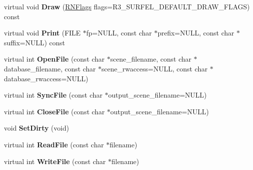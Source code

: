 \begin{DoxyCompactItemize}
\item 
virtual void {\bfseries Draw} (\hyperlink{class_r_n_flags}{R\+N\+Flags} flags=R3\+\_\+\+S\+U\+R\+F\+E\+L\+\_\+\+D\+E\+F\+A\+U\+L\+T\+\_\+\+D\+R\+A\+W\+\_\+\+F\+L\+A\+GS) const \hypertarget{class_r3_surfel_scene_a39a2895331a757858c28331533706f17}{}\label{class_r3_surfel_scene_a39a2895331a757858c28331533706f17}

\item 
virtual void {\bfseries Print} (F\+I\+LE $\ast$fp=N\+U\+LL, const char $\ast$prefix=N\+U\+LL, const char $\ast$suffix=N\+U\+LL) const \hypertarget{class_r3_surfel_scene_a0e6e2dc2ecb2811478aba53316564461}{}\label{class_r3_surfel_scene_a0e6e2dc2ecb2811478aba53316564461}

\item 
virtual int {\bfseries Open\+File} (const char $\ast$scene\+\_\+filename, const char $\ast$database\+\_\+filename, const char $\ast$scene\+\_\+rwaccess=N\+U\+LL, const char $\ast$database\+\_\+rwaccess=N\+U\+LL)\hypertarget{class_r3_surfel_scene_a1f4c23c978414e90f8ebbe42e09f4b4b}{}\label{class_r3_surfel_scene_a1f4c23c978414e90f8ebbe42e09f4b4b}

\item 
virtual int {\bfseries Sync\+File} (const char $\ast$output\+\_\+scene\+\_\+filename=N\+U\+LL)\hypertarget{class_r3_surfel_scene_a83d49ef4d3d30010d5cc88592cbb0dfc}{}\label{class_r3_surfel_scene_a83d49ef4d3d30010d5cc88592cbb0dfc}

\item 
virtual int {\bfseries Close\+File} (const char $\ast$output\+\_\+scene\+\_\+filename=N\+U\+LL)\hypertarget{class_r3_surfel_scene_a4e957a6b426d4df7951530603df522ab}{}\label{class_r3_surfel_scene_a4e957a6b426d4df7951530603df522ab}

\item 
void {\bfseries Set\+Dirty} (void)\hypertarget{class_r3_surfel_scene_ad75ada6bbd858db7d5ccf20aad03a81d}{}\label{class_r3_surfel_scene_ad75ada6bbd858db7d5ccf20aad03a81d}

\item 
virtual int {\bfseries Read\+File} (const char $\ast$filename)\hypertarget{class_r3_surfel_scene_aa1127051cc30232008abbcf48875b02d}{}\label{class_r3_surfel_scene_aa1127051cc30232008abbcf48875b02d}

\item 
virtual int {\bfseries Write\+File} (const char $\ast$filename)\hypertarget{class_r3_surfel_scene_af7b22843de09de955b57d7724a30ec4a}{}\label{class_r3_surfel_scene_af7b22843de09de955b57d7724a30ec4a}


\end{DoxyCompactItemize}

